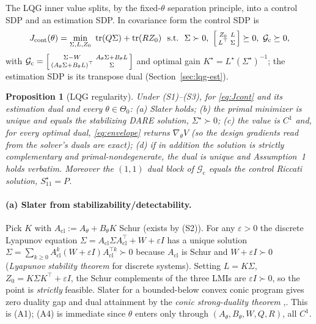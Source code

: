 \documentclass[11pt]{article}
\newtheorem{proposition}{Proposition}
\theoremstyle{definition}
\DeclareMathOperator{\tr}{tr}
\newcommand{\Acl}{A_{\mathrm{cl}}}
\newcommand{\Th}{\theta}
\newcommand{\Nbhd}{\Theta_{0}}
\begin{document}
The LQG inner value splits, by the fixed-$\Th$ separation principle, into a
control SDP and an estimation SDP. In covariance form the control SDP is
\begin{equation}\label{eq:Jcont}
J_{\mathrm{cont}}(\Th)=\min_{\Sigma,L,Z_0}\ \tr(Q\Sigma)+\tr(RZ_0)\ \
\text{s.t.}\ \ \Sigma\succ0,\
\begin{bsmallmatrix}Z_0&L\\L^\top&\Sigma\end{bsmallmatrix}\succeq0,\
\mathcal G_{\mathrm c}\succeq0,
\end{equation}
with $\mathcal G_{\mathrm c}=
\begin{bsmallmatrix}\Sigma-W & A_\Th\Sigma+B_\Th L\\
(A_\Th\Sigma+B_\Th L)^\top & \Sigma\end{bsmallmatrix}$ and optimal gain
$K^\star=L^\star(\Sigma^\star)^{-1}$; the estimation SDP is its transpose dual
(Section~\ref{sec:lqg-est}).

\begin{proposition}[LQG regularity]\label{prop:lqg}
Under \textup{(S1)}--\textup{(S3)}, for \eqref{eq:Jcont} and its estimation dual and
every $\Th\in\Nbhd$: \textup{(a)} Slater holds; \textup{(b)} the primal minimizer is
unique and equals the stabilizing DARE solution, $\Sigma^\star\succ0$;
\textup{(c)} the value is $C^1$ and, for \emph{every} optimal dual, \eqref{eq:envelope}
returns $\nabla_\Th V$ (so the design gradients read from the solver's duals are
exact); \textup{(d)} if in addition the solution is strictly complementary and
primal-nondegenerate, the dual is unique and Assumption~1 holds verbatim. Moreover
the $(1,1)$ dual block of $\mathcal G_{\mathrm c}$ equals the control Riccati
solution, $S_{11}^\star=P$.
\end{proposition}

\paragraph{(a) Slater from stabilizability/detectability.}
Pick $K$ with $\Acl:=A_\Th+B_\Th K$ Schur (exists by (S2)). For any $\varepsilon>0$
the discrete Lyapunov equation $\Sigma=\Acl\Sigma\Acl^\top+W+\varepsilon I$ has a
unique solution $\Sigma=\sum_{k\ge0}\Acl^k(W+\varepsilon I)\Acl^{\top k}\succ0$
because $\Acl$ is Schur and $W+\varepsilon I\succ0$ (\emph{Lyapunov stability
theorem} for discrete systems). Setting $L=K\Sigma$, $Z_0=K\Sigma K^\top+\varepsilon I$,
the Schur complements of the three LMIs are $\varepsilon I\succ0$, so the point is
\emph{strictly} feasible. Slater for a bounded-below convex conic program gives
zero duality gap and dual attainment by the \emph{conic strong-duality theorem}
\cite[Thm.~2.4.1]{BonnansShapiro},\cite[\S5.9]{BoydVandenberghe}. This is (A1); (A4)
is immediate since $\Th$ enters only through $(A_\Th,B_\Th,W,Q,R)$, all $C^1$.
\end{document}
